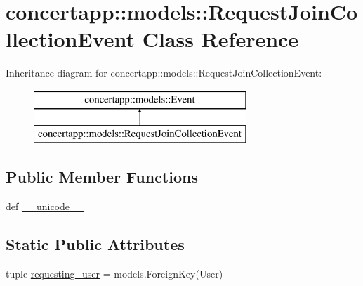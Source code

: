 \hypertarget{classconcertapp_1_1models_1_1_request_join_collection_event}{
\section{concertapp::models::RequestJoinCollectionEvent Class Reference}
\label{classconcertapp_1_1models_1_1_request_join_collection_event}
}
Inheritance diagram for concertapp::models::RequestJoinCollectionEvent:\begin{figure}[H]
\begin{center}
\leavevmode
\includegraphics[height=2.000000cm]{classconcertapp_1_1models_1_1_request_join_collection_event}
\end{center}
\end{figure}
\subsection*{Public Member Functions}
\begin{DoxyCompactItemize}
\item 
def \hyperlink{classconcertapp_1_1models_1_1_request_join_collection_event_a33372bed39ec4f5c5f4a40577ba13c3f}{\_\-\_\-unicode\_\-\_\-}
\end{DoxyCompactItemize}
\subsection*{Static Public Attributes}
\begin{DoxyCompactItemize}
\item 
tuple \hyperlink{classconcertapp_1_1models_1_1_request_join_collection_event_a962209b04acb8f88c10e05c9fc89c6d3}{requesting\_\-user} = models.ForeignKey(User)
\end{DoxyCompactItemize}


